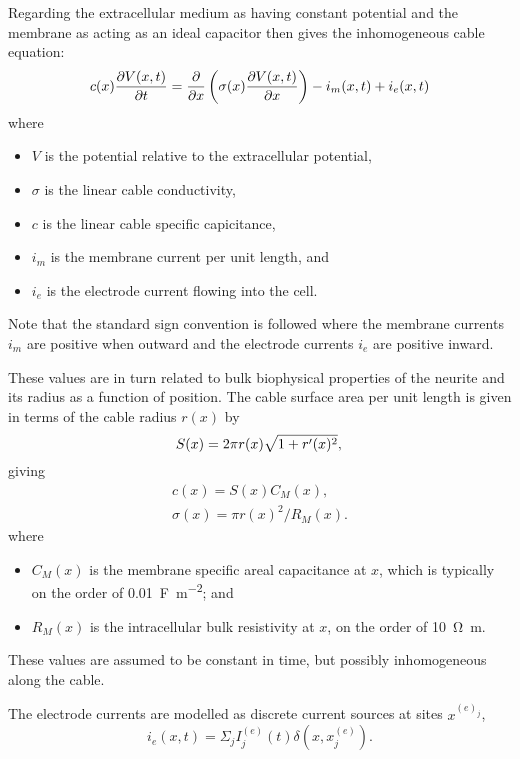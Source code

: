 Regarding the extracellular medium as having constant potential and the
membrane as acting as an ideal capacitor then gives the inhomogeneous cable
equation:
\begin{equation}
    \label{eq:cable}
    c(x) \frac{\partial{V(x, t)}}{\partial{t}} = \frac{\partial{}}{\partial{x}} \left( \sigma(x) \frac{\partial{V(x, t)}}{\partial{x}} \right) - i_m(x, t) + i_e(x, t)
\end{equation}
where
\begin{itemize}
    \item $V$ is the potential relative to the extracellular potential,
    \item $\sigma$ is the linear cable conductivity,
    \item $c$ is the linear cable specific capicitance,
    \item $i_m$ is the membrane current per unit length, and
    \item $i_e$ is the electrode current flowing into the cell.
\end{itemize}
Note that the standard sign convention is followed where the membrane currents $i_m$
are positive when outward and the electrode currents $i_e$ are positive inward.

These values are in turn related to bulk biophysical properties of the
neurite and its radius as a function of position. The cable surface area
per unit length is given in terms of the cable radius $r(x)$ by
\begin{equation}
    \label{eq:area}
    S(x) = 2 \pi r(x) \sqrt{1 + r'(x)^2}, \\
\end{equation}
giving
\begin{gather}
    c(x) = S(x) C_M(x), \\
    \sigma(x) = \pi r(x)^2 / R_M(x).
\end{gather}
where
\begin{itemize}
    \item $C_M(x)$ is the membrane specific areal capacitance at $x$, which is typically on the order of \SI{0.01}{\F\per\m\squared}; and
    \item $R_M(x)$ is the intracellular bulk resistivity at $x$, on the order of \SI{10}{\ohm\m}.
\end{itemize}
These values are assumed to be constant in time, but possibly inhomogeneous along the cable.

The electrode currents are modelled as discrete current sources at sites $x^{(e)_j}$,
\begin{equation}
    i_e(x, t) = \Sigma_j I^{(e)}_j(t) \delta(x, x^{(e)}_j).
\end{equation}


